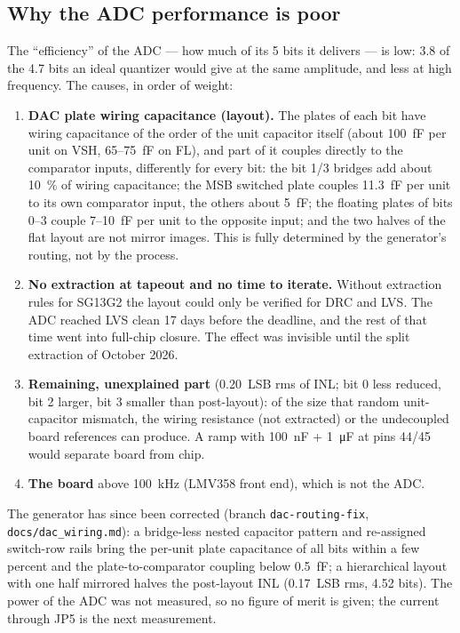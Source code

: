 \documentclass[10pt,a4paper]{article}
\begin{document}
\subsection{Why the ADC performance is poor}
\label{sec:adc_why}
The ``efficiency'' of the ADC --- how much of its 5 bits it delivers --- is low: 3.8 of the 4.7 bits an
ideal quantizer would give at the same amplitude, and less at high frequency. The causes, in order of
weight:
\begin{enumerate}
  \item \textbf{DAC plate wiring capacitance (layout).} The plates of each bit have wiring capacitance of
        the order of the unit capacitor itself (about \SI{100}{fF} per unit on VSH, 65--\SI{75}{fF} on FL),
        and part of it couples directly to the comparator inputs, differently for every bit: the bit 1/3
        bridges add about \SI{10}{\percent} of wiring capacitance; the MSB switched plate couples
        \SI{11.3}{fF} per unit to its own comparator input, the others about \SI{5}{fF}; the floating plates of
        bits 0--3 couple 7--\SI{10}{fF} per unit to the opposite input; and the two halves of the flat layout
        are not mirror images. This is fully determined by the generator's routing, not by the process.
  \item \textbf{No extraction at tapeout and no time to iterate.} Without extraction rules for SG13G2 the
        layout could only be verified for DRC and LVS. The ADC reached LVS clean 17 days before the
        deadline, and the rest of that time went into full-chip closure. The effect was invisible until
        the split extraction of October 2026.
  \item \textbf{Remaining, unexplained part} (\SI{0.20}{LSB} rms of INL; bit 0 less reduced, bit 2 larger,
        bit 3 smaller than post-layout): of the size that random unit-capacitor mismatch, the wiring
        resistance (not extracted) or the undecoupled board references can produce. A ramp with
        \SI{100}{nF} + \SI{1}{\micro F} at pins 44/45 would separate board from chip.
  \item \textbf{The board} above \SI{100}{kHz} (LMV358 front end), which is not the ADC.
\end{enumerate}
The generator has since been corrected (branch \texttt{dac-routing-fix}, \nolinkurl{docs/dac_wiring.md}): a
bridge-less nested capacitor pattern and re-assigned switch-row rails bring the per-unit plate capacitance
of all bits within a few percent and the plate-to-comparator coupling below \SI{0.5}{fF}; a hierarchical
layout with one half mirrored halves the post-layout INL (\SI{0.17}{LSB} rms, 4.52 bits). The power of the
ADC was not measured, so no figure of merit is given; the current through JP5 is the next measurement.
\end{document}
